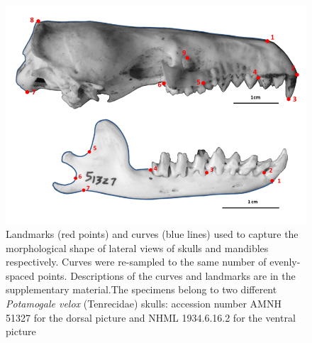 \documentclass[12pt,a4paper]{article}
\begin{document}
	\begin{figure}[H]
	\centering
	\includegraphics[width=1\linewidth]{figures/SkLat+mands_landmark_diagrams.png}
	
	\caption{Landmarks (red points) and curves (blue lines) used to capture the morphological shape of lateral views of skulls and mandibles respectively. Curves were re-sampled to the same number of evenly-spaced points. Descriptions of the curves and landmarks are in the supplementary material.The specimens belong to two different \textit{Potamogale velox} (Tenrecidae) skulls: accession number AMNH 51327 for the dorsal picture and NHML 1934.6.16.2 for the ventral picture}
	
	\label{fig:sklat_mands_landmarks}
	\end{figure}
%



\end{document}
